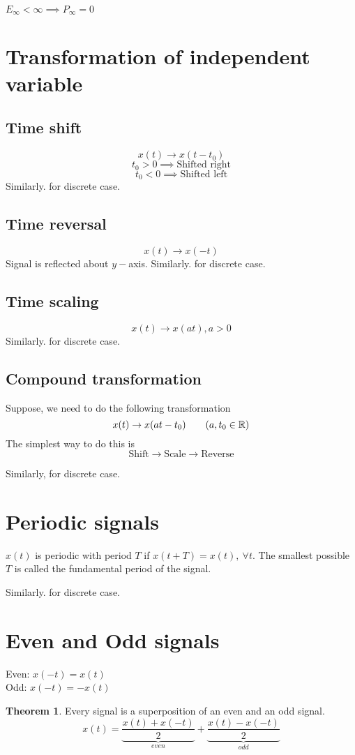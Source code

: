 \documentclass[10pt, a4paper]{extarticle}
\theoremstyle{definition}
\newtheorem*{thm}{Theorem}
\begin{document}
	$E_\infty<\infty\implies P_\infty=0$

	\section{Transformation of independent variable}
	\subsection{Time shift}
	\[x(t)\to x(t-t_0)\]
	\[t_0>0\implies\text{Shifted right}\]
	\[t_0<0\implies\text{Shifted left}\]
	Similarly. for discrete case.
	\subsection{Time reversal}
	\[x(t)\to x(-t)\]
	Signal is reflected about $y-$axis.
	Similarly. for discrete case.
	\subsection{Time scaling}
	\[x(t)\to x(at),a>0\]
	Similarly. for discrete case.
	\subsection{Compound transformation}
	Suppose, we need to do the following transformation\[x(t)\to x(at-t_0)\tag*{($a,t_0\in \mathbb{R}$)}\]
	The simplest way to do this is\[\text{Shift}\to\text{Scale}\to\text{Reverse}\]

	Similarly, for discrete case.

	\section{Periodic signals}
	$x(t)$ is periodic with period $T$ if $x(t+T)=x(t),\ \forall t$. The smallest possible $T$ is called the fundamental period of the signal.

	Similarly. for discrete case.
	\section{Even and Odd signals}
	Even: $x(-t)=x(t)$\\
	Odd: $x(-t)=-x(t)$

	\begin{thm} Every signal is a superposition of an even and an odd signal.
	\[x(t)=\underbrace{\frac{x(t)+x(-t)}{2}}_{even}+\underbrace{\frac{x(t)-x(-t)}{2}}_{odd}\]
	\end{thm}
\end{document}

